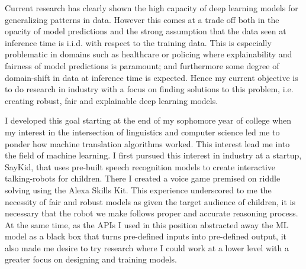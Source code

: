 \documentclass[12pt]{article}
\begin{document}



Current research has clearly shown the high capacity of deep learning models for generalizing patterns in data. However this comes at a trade off both in the opacity of model predictions and the strong assumption that the data seen at inference time is i.i.d. with respect to the training data. This is especially problematic in domains such as healthcare or policing where explainability and fairness of model predictions is paramount; and furthermore some degree of domain-shift in data at inference time is expected. Hence my current objective is to do research in industry with a focus on finding solutions to this problem, i.e. creating robust, fair and explainable deep learning models.


I developed this goal starting at the end of my sophomore year of college when my interest in the intersection of linguistics and computer science led me to ponder how machine translation algorithms worked. This interest lead me into the field of machine learning.
I first pursued this interest in industry at a startup, SayKid, that uses pre-built speech recognition models to create interactive talking-robots for children. There I created a voice game premised on riddle solving using the Alexa Skills Kit. This experience underscored to me the necessity of fair and robust models as given the target audience of children, it is necessary that the robot we make follows proper and accurate reasoning process. At the same time, as the APIs I used in this position abstracted away the ML model as a black box that turns pre-defined inputs into pre-defined output, it also made me desire to try research where I could work at a lower level with a greater focus on designing and training models. 
\end{document}
